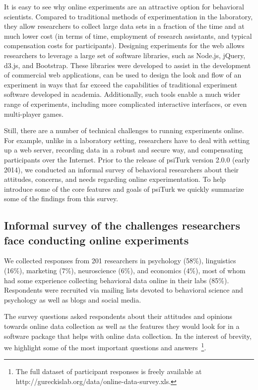 \documentclass[twocolumn]{svjour3}          %
\newcommand{\psiturk}[0]{\textsf{psiTurk}}
\begin{document}
It is easy to see why online experiments are an attractive option for behavioral 
scientists.  Compared to traditional methods of experimentation in the laboratory,
they allow researchers to collect large data sets in a fraction of the time and at 
much lower cost (in terms of time, employment of research assistants, and typical 
compensation costs for participants).  Designing experiments for the web allows 
researchers to leverage a large set of software libraries, such as Node.js, jQuery, d3.js, 
and Bootstrap. These libraries were developed to assist 
in the development of commercial web applications, can be used to design the look and flow of an 
experiment in ways 
that far exceed the capabilities of traditional experiment software developed 
in academia.  Additionally, such tools enable a much wider range of experiments, 
including more complicated interactive interfaces, or even multi-player games.

Still, there are a number of technical challenges to running experiments online.
For example, unlike in a laboratory setting, researchers have to 
deal with setting up a web server, recording data in a robust and secure way, 
and compensating participants over the Internet.  
Prior to the release of \psiturk{} version
2.0.0 (early 2014), we conducted an informal survey of behavioral researchers 
about their attitudes, concerns, and needs regarding online experimentation. 
To help introduce some of the core features and goals of \psiturk{} we 
quickly summarize some of the findings from this survey.



\subsection{Informal survey of the challenges researchers face conducting online experiments}
 We collected responses from 201 researchers in psychology (58\%),
linguistics (16\%), marketing (7\%), neuroscience (6\%), and economics (4\%), most of 
whom had some experience collecting behavioral data online in their labs (85\%).  
Respondents were recruited via mailing lists devoted to behavioral science and psychology 
as well as blogs and social media.

The survey questions asked respondents about their attitudes and opinions towards
online data collection as well as the features they would look for in a software package
that helps with online data collection.  In the interest of brevity, we highlight some of the
most important questions and answers~\footnote{The full dataset of participant responses
is freely available at \textsf{http://gureckislab.org/data/online-data-survey.xls}.}.
\end{document}
